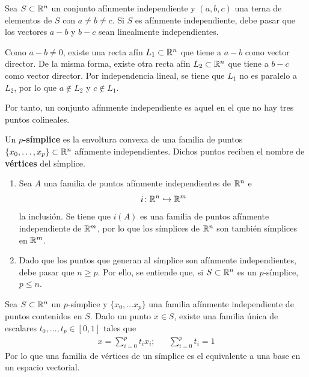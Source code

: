 \begin{remark}
Sea $S \subset \mathbb{R}^n$ un conjunto afínmente independiente y $(a,b,c)$ una
terna de elementos de $S$ con $a\neq b \neq c$. Si $S$ es afínmente
independiente, debe pasar que los vectores $a-b$ y $b-c$ sean linealmente
independientes.

Como $a-b\neq 0$, existe una recta afín $L_1 \subset \mathbb{R}^n$ que tiene a
$a-b$ como vector director. De la misma forma, existe otra recta afín
$L_2 \subset \mathbb{R}^n$ que tiene a $b-c$ como vector director. Por independencia
lineal, se tiene que $L_1$ no es paralelo a $L_2$, por lo que $a \not\in L_2$ y
$c \not\in L_1$.

Por tanto, un conjunto afínmente independiente es aquel en el que no hay tres
puntos colineales.
\end{remark}

\begin{definition}
Un \textbf{$p$-símplice} es la envoltura convexa de una familia de puntos $\{x_0,
\dots,x_p\} \subset \mathbb{R}^n$ afínmente independientes. Dichos puntos reciben el
nombre de \textbf{vértices} del símplice.
\end{definition}


\begin{remark}
\begin{enumerate}
\item Sea $A$ una familia de puntos afínmente independientes de $\mathbb{R}^n$ e
\[i\colon \mathbb{R}^n \hookrightarrow \mathbb{R}^m\]
la inclusión. Se tiene que $i(A)$ es una familia de puntos afínmente
independiente de $\mathbb{R}^m$, por lo que los símplices de $\mathbb{R}^n$ son también
símplices en $\mathbb{R}^m$.
\item Dado que los puntos que generan al símplice son afínmente independientes, debe
pasar que $n \geq p$. Por ello, se entiende que, si $S \subset \mathbb{R}^n$ es un
$p$-símplice, $p \leq n$.
\end{enumerate}
\end{remark}

\begin{proposition}
Sea $S\subset \mathbb{R}^n$ un $p$-símplice y $\{x_0,\dots x_p\}$ una familia
afínmente independiente de puntos contenidos en $S$. Dado un punto $x \in S$,
existe una familia única de escalares $t_0,\dots, t_p \in [0,1]$ tales que
\begin{align*}
x=\sum^p_{i=0}t_ix_i; && \sum^p_{i=0}t_i=1
\end{align*}
Por lo que una familia de vértices de un símplice es el equivalente a una base
en un espacio vectorial.
\end{proposition}

